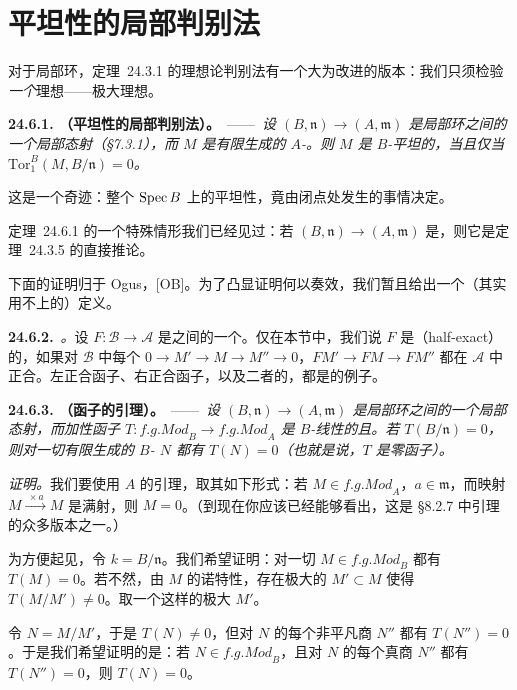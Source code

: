 
\section{平坦性的局部判别法}

对于\trNoether{}局部环，\mbox{定理~24.3.1} 的理想论判别法有一个大为改进的版本：我们只须检验\emph{一个}理想——极大理想。

\textbf{24.6.1. \trhTheorem（平坦性的局部判别法）。}\ ——\ \emph{设 $(B,\mathfrak{n})\to(A,\mathfrak{m})$ 是\trNoether{}局部环之间的一个局部态射（\S7.3.1），而 $M$ 是有限生成的 $A$-\trModule。则 $M$ 是 $B$-平坦的，当且仅当 $\mathrm{Tor}^B_1(M,B/\mathfrak{n})=0$。}

这是一个奇迹：整个 $\operatorname{Spec} B$ 上的平坦性，竟由闭点处发生的事情决定。

\mbox{定理~24.6.1} 的一个特殊情形我们已经见过：若 $(B,\mathfrak{n})\to(A,\mathfrak{m})$ 是\trIsomorphism，则它是\mbox{定理~24.3.5} 的直接推论。

下面的证明归于 Ogus，[OB]。为了凸显证明何以奏效，我们暂且给出一个（其实用不上的）定义。

\textbf{24.6.2.}\ \emph{\trhDefinition。}\quad 设 $F\colon\mathscr{B}\to\mathscr{A}$ 是\trAbelianCategory{}之间的一个\trAdditiveFunctor。仅在本节中，我们说 $F$ 是\textbf{\trHalfExact}（half-exact）的，如果对 $\mathscr{B}$ 中每个\trShortExactSequence{} $0\to M'\to M\to M''\to 0$，$FM'\to FM\to FM''$ 都在 $\mathscr{A}$ 中正合。左正合函子、右正合函子，以及二者的\trDerivedFunctor，都是\trHalfExact{}的例子。

\textbf{24.6.3. \trhTheorem（\trHalfExact{}函子的\trNakayama{}引理）。}\ ——\ \emph{设 $(B,\mathfrak{n})\to(A,\mathfrak{m})$ 是\trNoether{}局部环之间的一个局部态射，而加性函子 $T\colon\mathit{f.g.Mod}_B\to\mathit{f.g.Mod}_A$ 是 $B$-线性的且\trHalfExact{}。若 $T(B/\mathfrak{n})=0$，则对一切有限生成的 $B$-\trModule{} $N$ 都有 $T(N)=0$（也就是说，$T$ 是零函子）。}

\emph{证明。}\quad 我们要使用 $A$ 的\trNakayama{}引理，取其如下形式：若 $M\in\mathit{f.g.Mod}_A$，$a\in\mathfrak{m}$，而映射 $M\xrightarrow{\ \times a\ }M$ 是满射，则 $M=0$。（到现在你应该已经能够看出，这是 \S8.2.7 中\trNakayama{}引理的众多版本之一。）

为方便起见，令 $k=B/\mathfrak{n}$。我们希望证明：对一切 $M\in\mathit{f.g.Mod}_B$ 都有 $T(M)=0$。若不然，由 $M$ 的诺特性，存在极大的 $M'\subset M$ 使得 $T(M/M')\ne 0$。取一个这样的极大 $M'$。

令 $N=M/M'$，于是 $T(N)\ne 0$，但对 $N$ 的每个非平凡商 $N''$ 都有 $T(N'')=0$。于是我们希望证明的是：若 $N\in\mathit{f.g.Mod}_B$，且对 $N$ 的每个真商 $N''$ 都有 $T(N'')=0$，则 $T(N)=0$。

